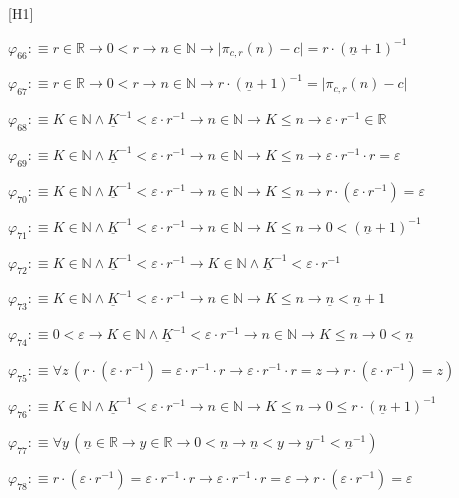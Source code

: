 \begin{fullproof}{[H1]}
\begin{abbrevlist}
\item $\varphi_{66} :\equiv r \in \mathbb{R} \to 0 < r \to n \in \mathbb{N} \to \lvert \pi_{c,r}(n) - c \rvert = r \cdot (\underline{n} + 1)^{-1}$
\item $\varphi_{67} :\equiv r \in \mathbb{R} \to 0 < r \to n \in \mathbb{N} \to r \cdot (\underline{n} + 1)^{-1} = \lvert \pi_{c,r}(n) - c \rvert$
\item $\varphi_{68} :\equiv K \in \mathbb{N} \land \underline{K}^{-1} < \varepsilon \cdot r^{-1} \to n \in \mathbb{N} \to K \leq n \to \varepsilon \cdot r^{-1} \in \mathbb{R}$
\item $\varphi_{69} :\equiv K \in \mathbb{N} \land \underline{K}^{-1} < \varepsilon \cdot r^{-1} \to n \in \mathbb{N} \to K \leq n \to \varepsilon \cdot r^{-1} \cdot r = \varepsilon$
\item $\varphi_{70} :\equiv K \in \mathbb{N} \land \underline{K}^{-1} < \varepsilon \cdot r^{-1} \to n \in \mathbb{N} \to K \leq n \to r \cdot (\varepsilon \cdot r^{-1}) = \varepsilon$
\item $\varphi_{71} :\equiv K \in \mathbb{N} \land \underline{K}^{-1} < \varepsilon \cdot r^{-1} \to n \in \mathbb{N} \to K \leq n \to 0 < (\underline{n} + 1)^{-1}$
\item $\varphi_{72} :\equiv K \in \mathbb{N} \land \underline{K}^{-1} < \varepsilon \cdot r^{-1} \to K \in \mathbb{N} \land \underline{K}^{-1} < \varepsilon \cdot r^{-1}$
\item $\varphi_{73} :\equiv K \in \mathbb{N} \land \underline{K}^{-1} < \varepsilon \cdot r^{-1} \to n \in \mathbb{N} \to K \leq n \to \underline{n} < \underline{n} + 1$
\item $\varphi_{74} :\equiv 0 < \varepsilon \to K \in \mathbb{N} \land \underline{K}^{-1} < \varepsilon \cdot r^{-1} \to n \in \mathbb{N} \to K \leq n \to 0 < \underline{n}$
\item $\varphi_{75} :\equiv \forall z\,(r \cdot (\varepsilon \cdot r^{-1}) = \varepsilon \cdot r^{-1} \cdot r \to \varepsilon \cdot r^{-1} \cdot r = z \to r \cdot (\varepsilon \cdot r^{-1}) = z)$
\item $\varphi_{76} :\equiv K \in \mathbb{N} \land \underline{K}^{-1} < \varepsilon \cdot r^{-1} \to n \in \mathbb{N} \to K \leq n \to 0 \leq r \cdot (\underline{n} + 1)^{-1}$
\item $\varphi_{77} :\equiv \forall y\,(\underline{n} \in \mathbb{R} \to y \in \mathbb{R} \to 0 < \underline{n} \to \underline{n} < y \to y^{-1} < \underline{n}^{-1})$
\item $\varphi_{78} :\equiv r \cdot (\varepsilon \cdot r^{-1}) = \varepsilon \cdot r^{-1} \cdot r \to \varepsilon \cdot r^{-1} \cdot r = \varepsilon \to r \cdot (\varepsilon \cdot r^{-1}) = \varepsilon$

\end{abbrevlist}
\end{fullproof}

